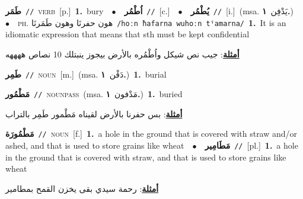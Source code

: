 \documentclass[10pt,a4paper,twoside]{article} %
\begin{document}
\begin{multicols}{2}
{\setlength\topsep{0pt}\textbf{\foreignlanguage{arabic}{طَمَر}}\ {\color{gray}\texttt{//}\color{black}}\ \textsc{verb}\ [p.]\ \textbf{1.}~bury\ \ $\bullet$\ \ \setlength\topsep{0pt}\textbf{\foreignlanguage{arabic}{اُطْمُر}}\ {\color{gray}\texttt{//}\color{black}}\ [c.]\ \ $\bullet$\ \ \setlength\topsep{0pt}\textbf{\foreignlanguage{arabic}{يُطْمُر}}\ {\color{gray}\texttt{//}\color{black}}\ [i.]\ \color{gray}(msa. \foreignlanguage{arabic}{يَدْفِن}~\foreignlanguage{arabic}{\textbf{١.}})\color{black}\ \ $\bullet$\ \ \textsc{ph.} \color{gray} \foreignlanguage{arabic}{هون حفرنَا وهون طَمَرنَا}\color{black}\ {\color{gray}\texttt{/{\sffamily hoːn ħafarna wuhoːn tˤamarna}/}\color{black}}\ \textbf{1.}~It is an idiomatic expression that means that sth must be kept confidential\  \begin{flushright}\color{gray}\foreignlanguage{arabic}{\textbf{\underline{\foreignlanguage{arabic}{أمثلة}}}: جيب نص شيكل واُطْمُره بالأرض بيجوز ينبتلك 10 نصاص ههههه}\end{flushright}\color{black}} \vspace{2mm}

{\setlength\topsep{0pt}\textbf{\foreignlanguage{arabic}{طَمِر}}\ {\color{gray}\texttt{//}\color{black}}\ \textsc{noun}\ [m.]\ \color{gray}(msa. \foreignlanguage{arabic}{دَفْن}~\foreignlanguage{arabic}{\textbf{١.}})\color{black}\ \textbf{1.}~burial\ } \vspace{2mm}

{\setlength\topsep{0pt}\textbf{\foreignlanguage{arabic}{مَطْمُور}}\ {\color{gray}\texttt{//}\color{black}}\ \textsc{noun\textunderscore pass}\ \color{gray}(msa. \foreignlanguage{arabic}{مَدْفون}~\foreignlanguage{arabic}{\textbf{١.}})\color{black}\ \textbf{1.}~buried\  \begin{flushright}\color{gray}\foreignlanguage{arabic}{\textbf{\underline{\foreignlanguage{arabic}{أمثلة}}}: بس حفرنا بالأرض لقيناه مَطْمور طَمِر بالتراب}\end{flushright}\color{black}} \vspace{2mm}

{\setlength\topsep{0pt}\textbf{\foreignlanguage{arabic}{مَطْمُورَة}}\ {\color{gray}\texttt{//}\color{black}}\ \textsc{noun}\ [f.]\ \textbf{1.}~a hole in the ground that is covered with straw and/or ashed, and that is used to store grains like wheat\ \ $\bullet$\ \ \setlength\topsep{0pt}\textbf{\foreignlanguage{arabic}{مَطَامِير}}\ {\color{gray}\texttt{//}\color{black}}\ [pl.]\ \textbf{1.}~a hole in the ground that is covered with straw, and that is used to store grains like wheat\  \begin{flushright}\color{gray}\foreignlanguage{arabic}{\textbf{\underline{\foreignlanguage{arabic}{أمثلة}}}: رحمة سيدي بقى يخزن القمح بمطامير}\end{flushright}\color{black}} \vspace{2mm}


\end{multicols}
\end{document}
